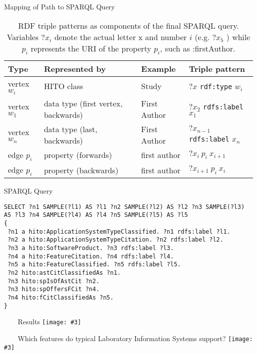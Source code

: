 \documentclass[aspectratio=1610,12pt]{beamer}
\newcommand{\imageslide}[4][]
{
\newgeometry{margin=0cm,top=1em}
\begin{frame}[plain]{~~~~#2}
\vspace{0.2em}
\centering\texttt{[image: \#3]}
\\#1
\note{#4}
\end{frame}
\restoregeometry
}
\begin{document}
\begin{frame}{Mapping of Path to SPARQL Query}
\begin{table}[ht]
\centering
\begin{tabular}{@{}llll@{}}
\toprule
Type & Represented by & Example & Triple pattern \\ \midrule
vertex $w_i$ & HITO class & Study & ?$x$ \texttt{rdf:type} $w_i$ \\
vertex $w_1$ & data type (first vertex, backwards) & First Author & $?x_2$ \texttt{rdfs:label} $x_1$ \\
vertex $w_n$ & data type (last, backwards) & First Author & $?x_{n-1}$ \texttt{rdfs:label} $x_n$ \\
edge $p_i$ & property (forwards) & first author & $?x_i \ p_i \ x_{i+1}$ \\
edge $p_i$ & property (backwards) & first author & $?x_{i+1} \ p_i \ x_i$ \\ \bottomrule
\end{tabular}
\caption{RDF triple patterns as components of the final SPARQL query. Variables $?x_i$ denote the actual letter x and number $i$ (e.g. $?x_5$ ) while $p_i$ represents the URI of the property $p_i$, such as :firstAuthor.}
\end{table}
\end{frame}

\begin{frame}[fragile]{SPARQL Query}
\begin{verbatim}
SELECT ?n1 SAMPLE(?l1) AS ?l1 ?n2 SAMPLE(?l2) AS ?l2 ?n3 SAMPLE(?l3) AS ?l3 ?n4 SAMPLE(?l4) AS ?l4 ?n5 SAMPLE(?l5) AS ?l5
{
 ?n1 a hito:ApplicationSystemTypeClassified. ?n1 rdfs:label ?l1.
 ?n2 a hito:ApplicationSystemTypeCitation. ?n2 rdfs:label ?l2.
 ?n3 a hito:SoftwareProduct. ?n3 rdfs:label ?l3.
 ?n4 a hito:FeatureCitation. ?n4 rdfs:label ?l4.
 ?n5 a hito:FeatureClassified. ?n5 rdfs:label ?l5.
 ?n2 hito:astCitClassifiedAs ?n1.
 ?n3 hito:spIsOfAstCit ?n2.
 ?n3 hito:spOffersFCit ?n4.
 ?n4 hito:fCitClassifiedAs ?n5.
}
\end{verbatim}
\end{frame}


\imageslide{Results}{img/gui2.png}{}{}
\imageslide{\large Which features do typical Laboratory Information Systems support?}{img/gui3.png}{}{}



\end{document}
